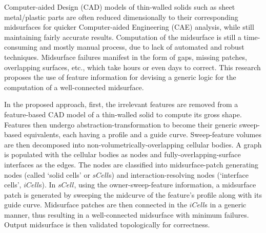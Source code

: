 

Computer-aided Design (CAD) models of thin-walled solids such as sheet metal/plastic parts are often reduced dimensionally to their corresponding midsurfaces for quicker Computer-aided Engineering (CAE) analysis, while still maintaining fairly accurate results. Computation of the midsurface is still a time-consuming and mostly manual process, due to lack of automated and robust  techniques. Midsurface failures manifest in the form of gaps, missing patches, overlapping surfaces, etc., which take hours or even days to correct. This research proposes the use of feature information for devising a generic logic for the computation of a well-connected midsurface.

In the proposed approach, first, the  irrelevant features are removed from a feature-based CAD model of a thin-walled solid to compute its gross shape. Features then undergo abstraction-transformation to become their generic sweep-based equivalents, each having a profile and a guide curve. Sweep-feature volumes are then decomposed into non-volumetrically-overlapping cellular bodies. A graph is populated with the cellular bodies as nodes and fully-overlapping-surface interfaces as the edges. The nodes are classified into midsurface-patch generating nodes (called `solid cells' or $sCell$s) and interaction-resolving nodes (`interface cells', $iCell$s). In $sCell$, using the owner-sweep-feature information, a midsurface patch is generated by sweeping the midcurve of the feature's profile along with its guide curve. Midsurface patches are then connected in the $iCell$s in a generic manner, thus resulting in a well-connected midsurface with minimum failures. Output midsurface is then validated topologically for correctness.

